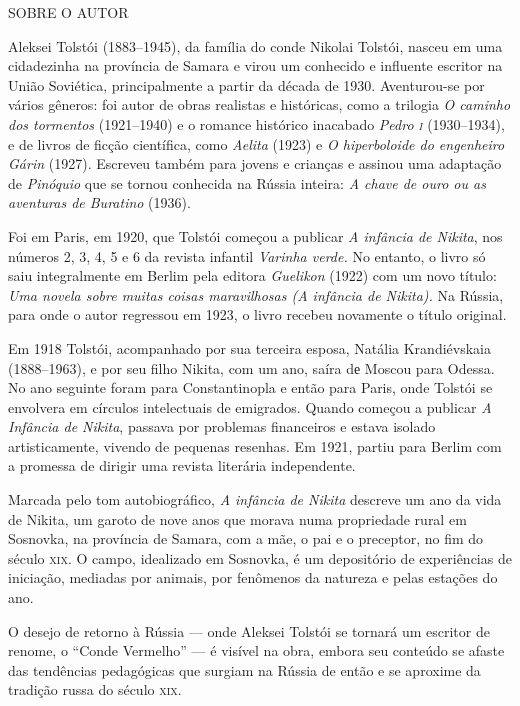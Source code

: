 \pagebreak
\thispagestyle{empty}

\movetooddpage
\small\textlt
\label{colaboradores}

\noindent{}SOBRE O AUTOR\\
{\small

Aleksei Tolstói (1883--1945), da família do conde Nikolai Tolstói,
nasceu em uma cidadezinha na província de Samara e virou um conhecido e
influente escritor na União Soviética, principalmente a partir da década
de 1930. Aventurou-se por vários gêneros: foi autor de obras realistas e
históricas, como a trilogia \emph{O caminho dos tormentos} (1921--1940) e
o romance histórico inacabado \emph{Pedro \textsc{i}} (1930--1934), e de livros de
ficção científica, como \emph{Aelita} (1923) e \emph{O hiperboloide do
engenheiro Gárin} (1927). Escreveu também para jovens e crianças e
assinou uma adaptação de \emph{Pinóquio} que se tornou conhecida na
Rússia inteira: \emph{A chave de ouro ou as aventuras de Buratino}
(1936).

Foi em Paris, em 1920, que Tolstói começou a publicar \emph{A infância
de Nikita}, nos números 2, 3, 4, 5 e 6 da revista infantil \emph{Varinha
verde.} No entanto, o livro só saiu integralmente em Berlim pela editora
\emph{Guelikon} (1922) com um novo título: \emph{Uma novela sobre muitas
coisas maravilhosas (A infância de Nikita).} Na Rússia, para onde o
autor regressou em 1923, o livro recebeu novamente o título original.

Em 1918 Tolstói, acompanhado por sua terceira esposa, Natália
Krandiévskaia (1888--1963), e por seu filho Nikita, com um ano, saíra dе
Moscou para Odessa. No ano seguinte foram para Constantinopla e então
para Paris, onde Tolstói se envolvera em círculos intelectuais de
emigrados. Quando começou a publicar \emph{A Infância de Nikita},
passava por problemas financeiros e estava isolado artisticamente,
vivendo de pequenas resenhas. Em 1921, partiu para Berlim com a promessa
de dirigir uma revista literária independente.

Marcada pelo tom autobiográfico, \emph{A infância de Nikita} descreve um
ano da vida de Nikita, um garoto de nove anos que morava numa
propriedade rural em Sosnovka, na província de Samara, com a mãe, o pai
e o preceptor, no fim do século \textsc{xix}. O campo, idealizado em Sosnovka, é
um depositório de experiências de iniciação, mediadas por animais, por
fenômenos da natureza e pelas estações do ano.

O desejo de retorno à Rússia --- onde Aleksei Tolstói se tornará um
escritor de renome, o ``Conde Vermelho'' --- é visível na obra, embora
seu conteúdo se afaste das tendências pedagógicas que surgiam na Rússia
de então e se aproxime da tradição russa do século \textsc{xix}.
}


